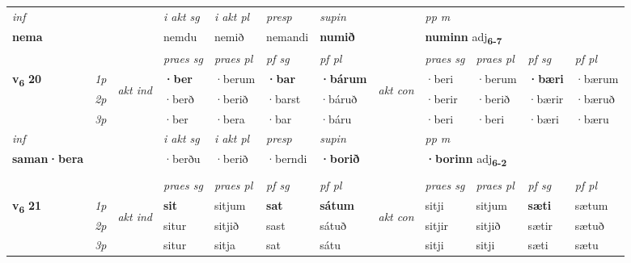 \begin{longtable}[l]{X>{\footnotesize\itshape}llXXXXlXXXX}
   {\textit{inf}} & &  & \textit{i akt sg} & \textit{i akt pl}   & \textit{presp} & \textit{supin}  && \textit{pp m} \\*
  {\textbf{nema}} & && nemdu  & nemið   & nemandi &  \textbf{numið}  && \multicolumn{2}{l}{\textbf{numinn} adj\textbf{\textsubscript{6-7}}} \\*

\midrule

 & &   & \textit{praes sg}  & \textit{praes pl}    & \textit{ pf sg} & \textit{pf pl} & & \textit{praes sg}  & \textit{praes pl}    & \textit{pf sg} & \textit{pf pl }  \\ \cmidrule{4-7} \cmidrule{9-12}
 \multirow{2}{*}{{{\textbf{v{\textsubscript{6}}} \Large{\textbf{20}}}}}  & 1p & \multirow{3}{*}{\begin{turn}{90}\textit{akt ind}\end{turn}} & \textbf{·ber} & ·berum & \textbf{·bar} & \textbf{·bárum} & \multirow{3}{*}{\begin{turn}{90}\textit{akt con}\end{turn}} &·beri & ·berum & \textbf{·bæri} & ·bærum\\*
 & 2p &  &  ·berð  & ·berið & ·barst & ·báruð & & ·berir & ·berið & ·bærir & ·bæruð \\*
 & 3p &  & ·ber & ·bera & ·bar & ·báru & & ·beri & ·beri& ·bæri & ·bæru \\*
\cmidrule{4-7} \cmidrule{9-12}

   {\textit{inf}} & &  & \textit{i akt sg} & \textit{i akt pl}   & \textit{presp} & \textit{supin}  && \textit{pp m} \\*
  {\textbf{saman\allowbreak ·bera}} & && ·berðu  & ·berið   & ·berndi &  \textbf{·borið}  && \multicolumn{2}{l}{\textbf{·borinn} adj\textbf{\textsubscript{6-2}}} \\*

\midrule
  & \\
   \midrule
 & &   & \textit{praes sg}  & \textit{praes pl}    & \textit{ pf sg} & \textit{pf pl} & & \textit{praes sg}  & \textit{praes pl}    & \textit{pf sg} & \textit{pf pl }  \\ \cmidrule{4-7} \cmidrule{9-12}
 \multirow{2}{*}{{{\textbf{v{\textsubscript{6}}} \Large{\textbf{21}}}}}  & 1p & \multirow{3}{*}{\begin{turn}{90}\textit{akt ind}\end{turn}} & \textbf{sit} & sitjum & \textbf{sat} & \textbf{sátum} & \multirow{3}{*}{\begin{turn}{90}\textit{akt con}\end{turn}} &sitji & sitjum & \textbf{sæti} & sætum\\*
 & 2p &  &  situr  & sitjið & sast & sátuð & & sitjir & sitjið & sætir & sætuð \\*
 & 3p &  & situr & sitja & sat & sátu & & sitji & sitji& sæti & sætu \\*
\cmidrule{4-7} \cmidrule{9-12}


\end{longtable}
